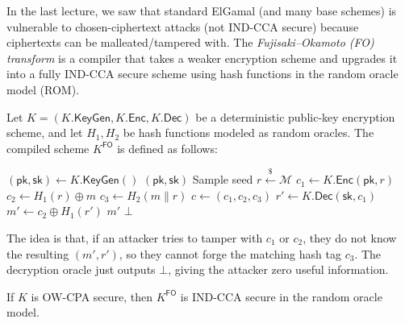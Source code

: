 
In the last lecture, we saw that standard ElGamal (and many base schemes) is vulnerable to chosen-ciphertext attacks (not IND-CCA secure) because ciphertexts can be malleated/tampered with.
The \emph{Fujisaki--Okamoto (FO) transform} is a compiler that takes a weaker encryption scheme and upgrades it into a fully IND-CCA secure scheme using hash functions in the random oracle model (ROM).

\begin{definition}\label{def:fo-transform}
    Let \(K = (K.\mathsf{KeyGen},\allowbreak K.\mathsf{Enc},\allowbreak K.\mathsf{Dec})\) be a deterministic public-key encryption scheme, and let \(H_1, H_2\) be hash functions modeled as random oracles.
    The compiled scheme \(K^{\mathsf{FO}}\) is defined as follows:
    \begin{algorithmic}[1]
            \State \((\mathsf{pk}, \mathsf{sk}) \gets K.\mathsf{KeyGen}()\)
            \State \Return \((\mathsf{pk}, \mathsf{sk})\)
        \EndProcedure
        \Statex
            \State Sample seed \(r \xleftarrow{\$} \mathcal{M}\)
            \State \(c_1 \gets K.\mathsf{Enc}(\mathsf{pk}, r)\)
            \State \(c_2 \gets H_1(r) \oplus m\)
            \State \(c_3 \gets H_2(m \parallel r)\)
            \State \Return \(c \gets (c_1, c_2, c_3)\)
        \EndProcedure
        \Statex
            \State \(r' \gets K.\mathsf{Dec}(\mathsf{sk}, c_1)\)
            \State \(m' \gets c_2 \oplus H_1(r')\)
                \State \Return \(m'\)
            \Else
                \State \Return \(\bot\)
            \EndIf
        \EndProcedure
    \end{algorithmic}
\end{definition}

The idea is that, if an attacker tries to tamper with \(c_1\) or \(c_2\), they do not know the resulting \((m', r')\), so they cannot forge the matching hash tag \(c_3\).
The decryption oracle just outputs \(\bot\), giving the attacker zero useful information.

\begin{theorem}
    If \(K\) is OW-CPA secure, then \(K^{\mathsf{FO}}\) is IND-CCA secure in the random oracle model.
\end{theorem}

